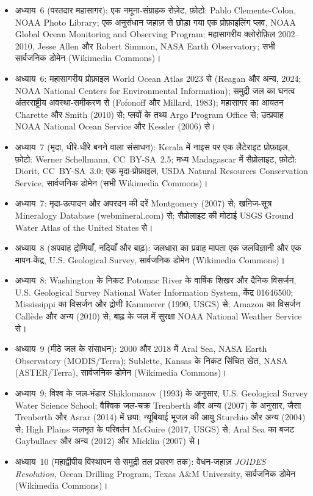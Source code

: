\begin{itemize}
  \item अध्याय~6 (परतदार महासागर): एक नमूना-संग्राहक रोज़ेट, फ़ोटो: Pablo Clemente-Colon, NOAA Photo Library; एक अनुसंधान जहाज़ से छोड़ा गया एक प्रोफ़ाइलिंग प्लव, NOAA Global Ocean Monitoring and Observing Program; महासागरीय क्लोरोफ़िल 2002--2010, Jesse Allen और Robert Simmon, NASA Earth Observatory; सभी सार्वजनिक डोमेन (Wikimedia Commons)।
  \item अध्याय~6: महासागरीय प्रोफ़ाइल World Ocean Atlas 2023 से (Reagan और अन्य, 2024; NOAA National Centers for Environmental Information); समुद्री जल का घनत्व अंतरराष्ट्रीय अवस्था-समीकरण से (Fofonoff और Millard, 1983); महासागर का आयतन Charette और Smith (2010) से; प्लवों के तथ्य Argo Program Office से; उत्प्रवाह NOAA National Ocean Service और Kessler (2006) से।
  \item अध्याय~7 (मृदा, धीरे-धीरे बनने वाला संसाधन): Kerala में नाइस पर एक लैटेराइट प्रोफ़ाइल, फ़ोटो: Werner Schellmann, CC~BY-SA~2.5; मध्य Madagascar में सैप्रोलाइट, फ़ोटो: Diorit, CC~BY-SA~3.0; एक मृदा-प्रोफ़ाइल, USDA Natural Resources Conservation Service, सार्वजनिक डोमेन (सभी Wikimedia Commons)।
  \item अध्याय~7: मृदा-उत्पादन और अपरदन की दरें Montgomery (2007) से; खनिज-सूत्र Mineralogy Database (webmineral.com) से; सैप्रोलाइट की मोटाई USGS Ground Water Atlas of the United States से।
  \item अध्याय~8 (अपवाह द्रोणियाँ, नदियाँ और बाढ़): जलधारा का प्रवाह मापता एक जलविज्ञानी और एक मापन-केंद्र, U.S. Geological Survey, सार्वजनिक डोमेन (Wikimedia Commons)।
  \item अध्याय~8: Washington के निकट Potomac River के वार्षिक शिखर और दैनिक विसर्जन, U.S. Geological Survey National Water Information System, केंद्र 01646500; Mississippi का विसर्जन और द्रोणी Kammerer (1990, USGS) से; Amazon का विसर्जन Callède और अन्य (2010) से; बाढ़ के जल में सुरक्षा NOAA National Weather Service से।
  \item अध्याय~9 (मीठे जल के संसाधन): 2000 और 2018 में Aral Sea, NASA Earth Observatory (MODIS/Terra); Sublette, Kansas के निकट सिंचित खेत, NASA (ASTER/Terra), सार्वजनिक डोमेन (Wikimedia Commons)।
  \item अध्याय~9: विश्व के जल-भंडार Shiklomanov (1993) के अनुसार, U.S. Geological Survey Water Science School; वैश्विक जल-चक्र Trenberth और अन्य (2007) के अनुसार, जैसा Trenberth और Asrar (2014) में छपा; न्यूबियाई भूजल की आयु Sturchio और अन्य (2004) से; High Plains जलभृत के परिवर्तन McGuire (2017, USGS) से; Aral Sea का बजट Gaybullaev और अन्य (2012) और Micklin (2007) से।
  \item अध्याय~10 (महाद्वीपीय विस्थापन से समुद्री तल प्रसरण तक): वेधन-जहाज़ \emph{JOIDES Resolution}, Ocean Drilling Program, Texas A\&M University, सार्वजनिक डोमेन (Wikimedia Commons)।

\end{itemize}
